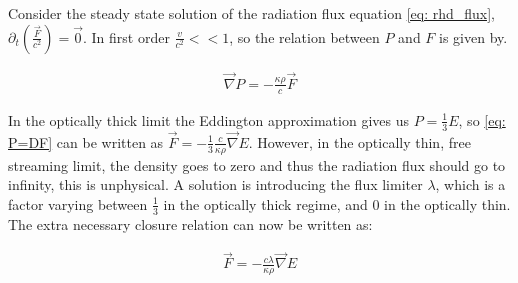Consider the steady state solution of the radiation flux equation \eqref{eq: rhd_flux}, $\partial_t \left(\frac{\vec{F}}{c^2} \right) = \vec{0}$. In first order $\frac{v}{c^2} << 1$, so the relation between $P$ and $F$ is given by.

\begin{align}
\vec{\nabla} P = - \frac{\kappa \rho}{c} \vec{F} \label{eq: P=DF}
\end{align}

In the optically thick limit the Eddington approximation gives us $P = \frac{1}{3}E$, so \eqref{eq: P=DF} can be written as $\vec{F} = -\frac{1}{3}\frac{c}{\kappa \rho} \vec{\nabla}E$. However, in the optically thin, free streaming limit, the density goes to zero and thus the radiation flux should go to infinity, this is unphysical. A solution is introducing the flux limiter $\lambda$, which is a factor varying between $\frac{1}{3}$ in the optically thick regime, and $0$ in the optically thin. The extra necessary closure relation can now be written as:

\begin{align}
\vec{F} = -\frac{c\lambda}{\kappa \rho} \vec{\nabla}E \label{eq: fld_closing}
\end{align}

